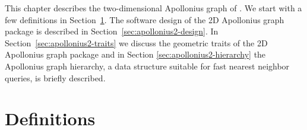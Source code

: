 

This chapter describes the two-dimensional Apollonius graph
of \cgal. We start with a few definitions in 
Section~\ref{sec:apollonius2-definitions}.
The software design of the 2D Apollonius graph package is described 
in Section~\ref{sec:apollonius2-design}.
In Section~\ref{sec:apollonius2-traits} we discuss the geometric
traits of the 2D Apollonius graph package and in Section
\ref{sec:apollonius2-hierarchy} the Apollonius graph hierarchy, a data
structure suitable for fast nearest neighbor queries, is briefly
described.


\section{Definitions}
\label{sec:apollonius2-definitions}


